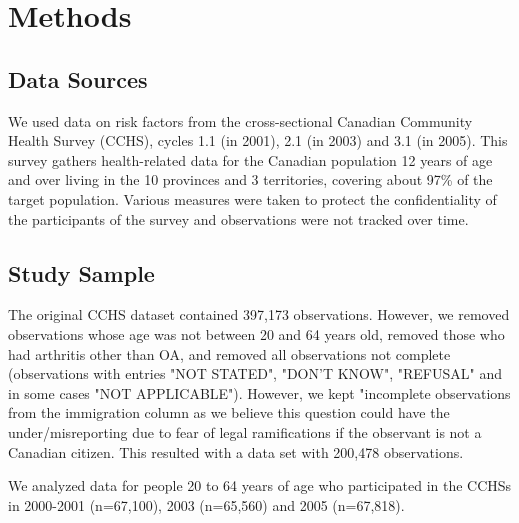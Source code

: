 \section{Methods}
\subsection{Data Sources}
We used data on risk factors from the cross-sectional
Canadian Community Health Survey (CCHS), cycles 1.1 (in
2001), 2.1 (in 2003) and 3.1 (in 2005). This survey gathers health-related data for the Canadian population 12 years of age and over living in the 10 provinces and 3 territories, covering about 97\% of the target population. Various measures were taken to protect the confidentiality of the participants of the survey and observations were not tracked over time.
\subsection{Study Sample}
The original CCHS dataset contained 397,173 observations. However, we removed observations whose age was not between 20 and 64 years old, removed those who had arthritis other than OA, and removed all observations not complete (observations with entries "NOT STATED", "DON'T KNOW", "REFUSAL" and in some cases "NOT APPLICABLE"). However, we kept "incomplete observations from the immigration column as we believe this question could have the under/misreporting due to fear of legal ramifications if the observant is not a Canadian citizen. This resulted with a data set with 200,478 observations.

We analyzed data for people 20 to 64 years of age who participated in the CCHSs in 2000-2001 (n=67,100), 2003 (n=65,560) and 2005 (n=67,818).